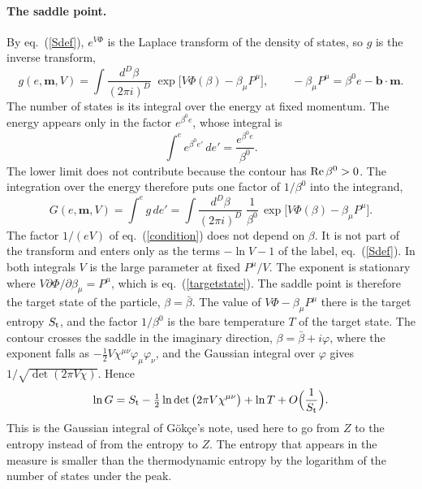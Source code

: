 \documentclass[11pt,aps,preprint,nofootinbib,superscriptaddress,tightenlines]{revtex4-2}
\def\st{\begin{equation}}
\def\stp{\end{equation}}
\def\Eq#1{eq.~(\ref{#1})}
\let\oldparagraph\paragraph
\renewcommand{\paragraph}{\par\bigskip\oldparagraph}
\begin{document}
\paragraph{The saddle point.}  By \Eq{Sdef}, $e^{V\Phi}$ is the Laplace transform of the density of states, so $g$ is the inverse transform,
\st
g(e,\bm m,V)=\int\frac{d^D\beta}{(2\pi i)^D}\;\exp\big[V\Phi(\beta)-\beta_\mu P^\mu\big],\qquad -\beta_\mu P^\mu=\beta^0e-\bm b\cdot\bm m .
\stp
The number of states is its integral over the energy at fixed momentum.  The energy appears only in the factor $e^{\beta^0e}$, whose integral is
\st
\int^{e}e^{\beta^0e'}\,de'=\frac{e^{\beta^0e}}{\beta^0} .
\stp
The lower limit does not contribute because the contour has ${\rm Re}\,\beta^0>0$.  The integration
over the energy therefore puts one factor of $1/\beta^0$ into the integrand,
\st
G(e,\bm m,V)=\int^{e}\!g\,de'=\int\frac{d^D\beta}{(2\pi i)^D}\;\frac1{\beta^0}\,\exp\big[V\Phi(\beta)-\beta_\mu P^\mu\big] .
\stp
The factor $1/(eV)$ of \Eq{condition} does not depend on $\beta$.  It is not part of the transform and enters only as the terms $-\ln V-1$ of the
label, \Eq{Sdef}.  In both integrals $V$ is
the large parameter at fixed $P^\mu/V$.  The exponent is stationary where $V\partial\Phi/\partial\beta_\mu=P^\mu$, which is \Eq{targetstate}.
The saddle point is therefore the target state of the particle, $\beta=\bar\beta$.  The value of $V\Phi-\beta_\mu P^\mu$ there is the target entropy
$S_{\rm t}$, and the factor $1/\beta^0$ is the bare temperature $T$ of the target state.  The contour crosses the saddle in the imaginary direction, $\beta=\bar\beta+i\varphi$, where the exponent
falls as $-\tfrac12V\chi^{\mu\nu}\varphi_\mu\varphi_\nu$, and the Gaussian integral over $\varphi$ gives $1/\sqrt{\det(2\pi V\chi)}$.  Hence
\st
\ln G=S_{\rm t}-\tfrac12\ln\det\big(2\pi V\chi^{\mu\nu}\big)+\ln T+O\Big(\frac1{S_{\rm t}}\Big) .
\stp
This is the Gaussian integral of G\"ok\c{c}e's note, used here to go from $Z$ to the entropy instead of from the entropy to $Z$.  The entropy that
appears in the measure is smaller than the thermodynamic entropy by the logarithm of the number of states under the peak.
\end{document}
